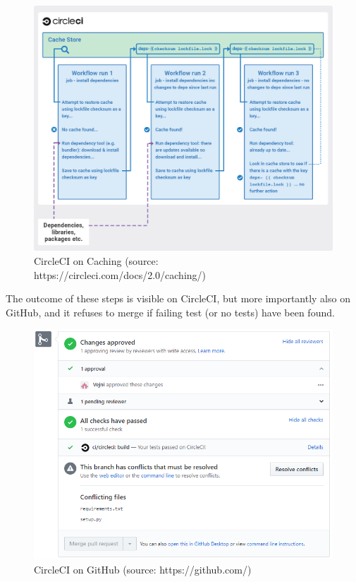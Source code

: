 \documentclass[main.tex]{subfiles}
\begin{document}
 \begin{figure}[H]
   \centering
   \includegraphics[width=\textwidth]{05Coding/05Pictures/cache_CI.png}
   \caption{CircleCI on Caching (source: https://circleci.com/docs/2.0/caching/)}
   \label{cache_CI}
\end{figure}

The outcome of these steps is visible on CircleCI, but more importantly also on GitHub, and it refuses to merge if failing test (or no tests) have been found.

 \begin{figure}[H]
   \centering
   \includegraphics[scale=0.6]{05Coding/05Pictures/circleCI.png}
   \caption{CircleCI on GitHub (source: https://github.com/)}
   \label{CircleCI}
\end{figure}
\end{document}
